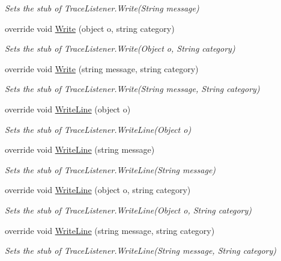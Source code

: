 \begin{DoxyCompactItemize}
\begin{DoxyCompactList}\small\item\em Sets the stub of Trace\-Listener.\-Write(\-String message)\end{DoxyCompactList}\item 
override void \hyperlink{class_system_1_1_diagnostics_1_1_fakes_1_1_stub_trace_listener_a3cc90fc6bc95e1bd4ece79c7138fe26a}{Write} (object o, string category)
\begin{DoxyCompactList}\small\item\em Sets the stub of Trace\-Listener.\-Write(\-Object o, String category)\end{DoxyCompactList}\item 
override void \hyperlink{class_system_1_1_diagnostics_1_1_fakes_1_1_stub_trace_listener_a00500c31ea115d3e5d29a0ba669df8d5}{Write} (string message, string category)
\begin{DoxyCompactList}\small\item\em Sets the stub of Trace\-Listener.\-Write(\-String message, String category)\end{DoxyCompactList}\item 
override void \hyperlink{class_system_1_1_diagnostics_1_1_fakes_1_1_stub_trace_listener_ad1a57dc842e5198a0c54df2a07d60a83}{Write\-Line} (object o)
\begin{DoxyCompactList}\small\item\em Sets the stub of Trace\-Listener.\-Write\-Line(\-Object o)\end{DoxyCompactList}\item 
override void \hyperlink{class_system_1_1_diagnostics_1_1_fakes_1_1_stub_trace_listener_a9e1906d0c4760a8ee48db8c34d71fb84}{Write\-Line} (string message)
\begin{DoxyCompactList}\small\item\em Sets the stub of Trace\-Listener.\-Write\-Line(\-String message)\end{DoxyCompactList}\item 
override void \hyperlink{class_system_1_1_diagnostics_1_1_fakes_1_1_stub_trace_listener_a490aa6dd5d107b0e6035da05b463607e}{Write\-Line} (object o, string category)
\begin{DoxyCompactList}\small\item\em Sets the stub of Trace\-Listener.\-Write\-Line(\-Object o, String category)\end{DoxyCompactList}\item 
override void \hyperlink{class_system_1_1_diagnostics_1_1_fakes_1_1_stub_trace_listener_a220d1c6f4c68593f4d61d6ae5ab40281}{Write\-Line} (string message, string category)
\begin{DoxyCompactList}\small\item\em Sets the stub of Trace\-Listener.\-Write\-Line(\-String message, String category)\end{DoxyCompactList}\end{DoxyCompactItemize}
